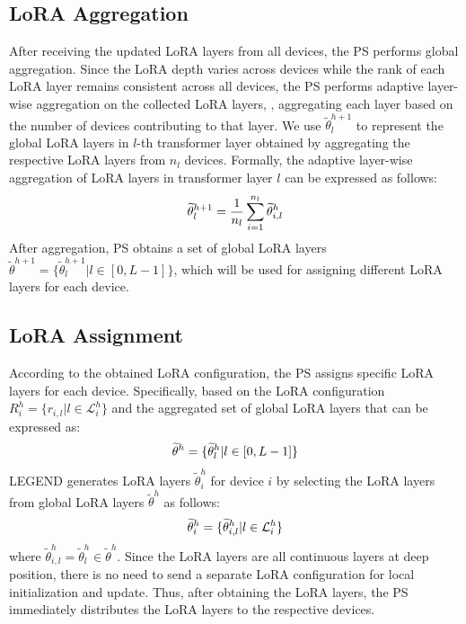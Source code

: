 \subsection{LoRA Aggregation}
\vspace{-0.1cm}
After receiving the updated LoRA layers from all devices, the PS performs global aggregation.
Since the LoRA depth varies across devices while the rank of each LoRA layer remains consistent across all devices, the PS performs adaptive layer-wise aggregation on the collected LoRA layers, \ie, aggregating each layer based on the number of devices contributing to that layer.
We use $\widetilde{\theta}^{h+1}_l$ to represent the global LoRA layers in $l$-th transformer layer obtained by aggregating the respective LoRA layers from $n_l$ devices.
Formally, the adaptive layer-wise aggregation of LoRA layers in transformer layer $l$ can be expressed as follows:
\vspace{-0.3cm}
\begin{equation}
    \widetilde{\theta}^{h+1}_l = \frac{1}{n_l} \sum_{i = 1}^{n_l} \widetilde{\theta}_{i,l}^{h}
    \vspace{-0.3cm}
\end{equation}
After aggregation, PS obtains a set of global LoRA layers $\widetilde{\theta}^{h+1} = \{ \widetilde{\theta}^{h+1}_l | l \in [0, L - 1] \}$, which will be used for assigning different LoRA layers for each device.

\subsection{LoRA Assignment}
\vspace{-0.2cm}
According to the obtained LoRA configuration, the PS assigns specific LoRA layers for each device.
Specifically, based on the LoRA configuration $R_i^h = \{r_{i,l} | l \in \mathcal{L}_i^h\}$ and the aggregated set of global LoRA layers that can be expressed as:
\vspace{-0.1cm}
\begin{equation}
    \widetilde{\theta}^{h} = \{ \widetilde{\theta}_{l}^{h} | l \in [0, L - 1] \}
    \vspace{-0.1cm}
\end{equation}
LEGEND generates LoRA layers $\widetilde{\theta}_i^h$ for device $i$ by selecting the LoRA layers from global LoRA layers $\widetilde{\theta}^{h}$ as follows:
\vspace{-0.1cm}
\begin{equation}
    \widetilde{\theta}_i^{h} = \{ \widetilde{\theta}_{i, l}^{h} | l \in \mathcal{L}_i^h\}
    \vspace{-0.1cm}
\end{equation}
where $\widetilde{\theta}_{i, l}^{h} = \widetilde{\theta}_l^{h} \in \widetilde{\theta}^{h}$.
Since the LoRA layers are all continuous layers at deep position, there is no need to send a separate LoRA configuration for local initialization and update.
Thus, after obtaining the LoRA layers, the PS immediately distributes the LoRA layers to the respective devices. 
\vspace{-0.5cm}

